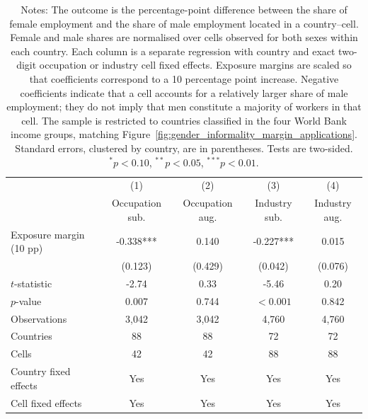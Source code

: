 \begin{table}[!htbp]
\centering
\caption{Within-cell associations between sex-specific employment composition and automation margins.}
\label{tab:appendix_ilostat_gender_fe_baseline}
\small
\begin{tabular}{lcccc}
\toprule
 & (1) & (2) & (3) & (4) \\
 & Occupation sub. & Occupation aug. & Industry sub. & Industry aug. \\
\midrule
Exposure margin (10 pp) & -0.338*** & 0.140 & -0.227*** & 0.015 \\
 & (0.123) & (0.429) & (0.042) & (0.076) \\
$t$-statistic & -2.74 & 0.33 & -5.46 & 0.20 \\
$p$-value & 0.007 & 0.744 & $<0.001$ & 0.842 \\
\midrule
Observations & 3,042 & 3,042 & 4,760 & 4,760 \\
Countries & 88 & 88 & 72 & 72 \\
Cells & 42 & 42 & 88 & 88 \\
Country fixed effects & Yes & Yes & Yes & Yes \\
Cell fixed effects & Yes & Yes & Yes & Yes \\
\bottomrule
\end{tabular}
\caption*{\scriptsize Notes: The outcome is the percentage-point difference between the share of female employment and the share of male employment located in a country--cell. Female and male shares are normalised over cells observed for both sexes within each country. Each column is a separate regression with country and exact two-digit occupation or industry cell fixed effects. Exposure margins are scaled so that coefficients correspond to a 10 percentage point increase. Negative coefficients indicate that a cell accounts for a relatively larger share of male employment; they do not imply that men constitute a majority of workers in that cell. The sample is restricted to countries classified in the four World Bank income groups, matching Figure~\ref{fig:gender_informality_margin_applications}. Standard errors, clustered by country, are in parentheses. Tests are two-sided. $^{*}p<0.10$, $^{**}p<0.05$, $^{***}p<0.01$.}
\end{table}
